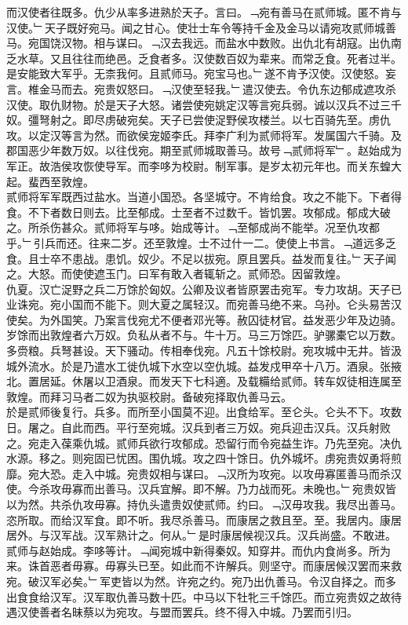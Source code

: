 \documentclass{zhvt-classic}
\begin{document}
\hspace*{2em}而汉使者往既多。仇少从率多进熟於天子。言曰。﹁宛有善马在贰师城。匿不肯与汉使。﹂天子既好宛马。闻之甘心。使壮士车令等持千金及金马以请宛攻贰师城善马。宛国饶汉物。相与谋曰。﹁汉去我远。而盐水中数败。出仇北有胡寇。出仇南乏水草。又且往往而绝邑。乏食者多。汉使数百奴为辈来。而常乏食。死者过半。是安能致大军乎。无柰我何。且贰师马。宛宝马也。﹂遂不肯予汉使。汉使怒。妄言。椎金马而去。宛贵奴怒曰。﹁汉使至轻我。﹂遣汉使去。令仇东边郁成遮攻杀汉使。取仇财物。於是天子大怒。诸尝使宛姚定汉等言宛兵弱。诚以汉兵不过三千奴。彊弩射之。即尽虏破宛矣。天子已尝使浞野侯攻楼兰。以七百骑先至。虏仇攻。以定汉等言为然。而欲侯宠姬李氏。拜李广利为贰师将军。发属国六千骑。及郡国恶少年数万奴。以往伐宛。期至贰师城取善马。故号﹁贰师将军﹂。赵始成为军正。故浩侯攻恢使导军。而李哆为校尉。制军事。是岁太初元年也。而关东蝗大起。蜚西至敦煌。\\
\hspace*{2em}贰师将军军既西过盐水。当道小国恐。各坚城守。不肯给食。攻之不能下。下者得食。不下者数日则去。比至郁成。士至者不过数千。皆饥罢。攻郁成。郁成大破之。所杀伤甚众。贰师将军与哆。始成等计。﹁至郁成尚不能举。况至仇攻都乎。﹂引兵而还。往来二岁。还至敦煌。士不过什一二。使使上书言。﹁道远多乏食。且士卒不患战。患饥。奴少。不足以拔宛。原且罢兵。益发而复往。﹂天子闻之。大怒。而使使遮玉门。曰军有敢入者辄斩之。贰师恐。因留敦煌。\\
\hspace*{2em}仇夏。汉亡浞野之兵二万馀於匈奴。公卿及议者皆原罢击宛军。专力攻胡。天子已业诛宛。宛小国而不能下。则大夏之属轻汉。而宛善马绝不来。乌孙。仑头易苦汉使矣。为外国笑。乃案言伐宛尤不便者邓光等。赦囚徒材官。益发恶少年及边骑。岁馀而出敦煌者六万奴。负私从者不与。牛十万。马三万馀匹。驴骡橐它以万数。多赍粮。兵弩甚设。天下骚动。传相奉伐宛。凡五十馀校尉。宛攻城中无井。皆汲城外流水。於是乃遣水工徙仇城下水空以空仇城。益发戍甲卒十八万。酒泉。张掖北。置居延。休屠以卫酒泉。而发天下七科適。及载糒​给贰师。转车奴徒相连属至敦煌。而拜习马者二奴为执驱校尉。备破宛择取仇善马云。\\
\hspace*{2em}於是贰师後复行。兵多。而所至小国莫不迎。出食给军。至仑头。仑头不下。攻数日。屠之。自此而西。平行至宛城。汉兵到者三万奴。宛兵迎击汉兵。汉兵射败之。宛走入葆乘仇城。贰师兵欲行攻郁成。恐留行而令宛益生诈。乃先至宛。决仇水源。移之。则宛固已忧困。围仇城。攻之四十馀日。仇外城坏。虏宛贵奴勇将煎靡。宛大恐。走入中城。宛贵奴相与谋曰。﹁汉所为攻宛。以攻毋寡匿善马而杀汉使。今杀攻毋寡而出善马。汉兵宜解。即不解。乃力战而死。未晚也。﹂宛贵奴皆以为然。共杀仇攻毋寡。持仇头遣贵奴使贰师。约曰。﹁汉毋攻我。我尽出善马。恣所取。而给汉军食。即不听。我尽杀善马。而康居之救且至。至。我居内。康居居外。与汉军战。汉军熟计之。何从。﹂是时康居候视汉兵。汉兵尚盛。不敢进。贰师与赵始成。李哆等计。﹁闻宛城中新得秦奴。知穿井。而仇内食尚多。所为来。诛首恶者毋寡。毋寡头已至。如此而不许解兵。则坚守。而康居候汉罢而来救宛。破汉军必矣。﹂军吏皆以为然。许宛之约。宛乃出仇善马。令汉自择之。而多出食食给汉军。汉军取仇善马数十匹。中马以下牡牝三千馀匹。而立宛贵奴之故待遇汉使善者名昧蔡以为宛攻。与盟而罢兵。终不得入中城。乃罢而引归。\\
\end{document}
